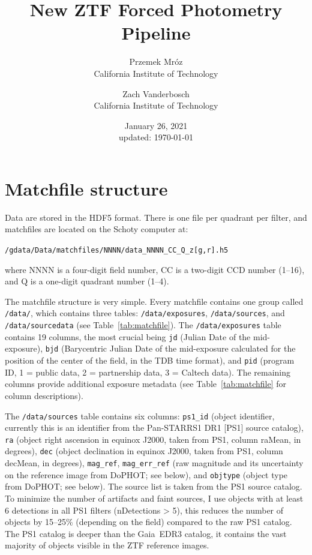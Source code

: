 \documentclass[11pt]{article}
\title{New ZTF Forced Photometry Pipeline}
\author{
    Przemek Mr\'oz\\ California Institute of Technology
    \and
    Zach Vanderbosch\\ California Institute of Technology
}
\date{January 26, 2021\\updated: \today}
\begin{document}
\maketitle

\section{Matchfile structure}

Data are stored in the HDF5 format. There is one file per quadrant per filter, and matchfiles are located on the Schoty computer at:
\begin{center}
{\tt /gdata/Data/matchfiles/NNNN/data\_NNNN\_CC\_Q\_z[g,r].h5}
\end{center}
where NNNN is a four-digit field number, CC is a two-digit CCD number (1--16), and Q is a one-digit quadrant number (1--4).

\vspace{0.2cm}
The matchfile structure is very simple. Every matchfile contains one group called \texttt{/data/}, which contains three tables: \texttt{/data/exposures}, \texttt{/data/sources}, and \texttt{/data/sourcedata} (see Table~\ref{tab:matchfile}). The \texttt{/data/exposures} table contains 19 columns, the most crucial being {\tt jd} (Julian Date of the mid-exposure), {\tt bjd} (Barycentric Julian Date of the mid-exposure calculated for the position of the center of the field, in the TDB time format), and {\tt pid} (program ID, 1 = public data, 2 = partnership data, 3 = Caltech data). The remaining columns provide additional exposure metadata (see Table~\ref{tab:matchfile} for column descriptions).

\vspace{0.2cm}
The \texttt{/data/sources} table contains six columns: {\tt ps1\_id} (object identifier, currently this is an identifier from the Pan-STARRS1 DR1 [PS1] source catalog), {\tt ra} (object right ascension in equinox J2000, taken from PS1, column raMean, in degrees), {\tt dec} (object declination in equinox J2000, taken from PS1, column decMean, in degrees), {\tt mag\_ref}, {\tt mag\_err\_ref} (raw magnitude and its uncertainty on the reference image from DoPHOT; see below), and {\tt objtype} (object type from DoPHOT; see below). The source list is taken from the PS1 source catalog. To minimize the number of artifacts and faint sources, I use objects with at least 6 detections in all PS1 filters (nDetections > 5), this reduces the number of objects by 15--25\% (depending on the field) compared to the raw PS1 catalog. The PS1 catalog is deeper than the Gaia~EDR3 catalog, it contains the vast majority of objects visible in the ZTF reference images.
\end{document}
